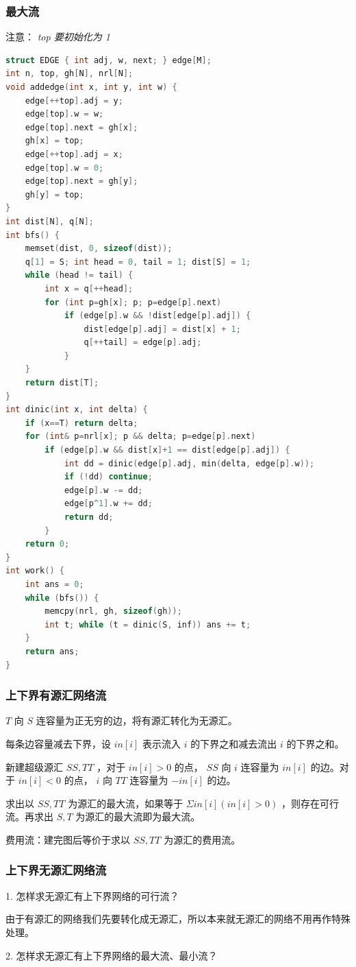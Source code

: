 \documentclass{article}
\begin{document}
\subsubsection{最大流}
注意： \emph{top 要初始化为 1}
\begin{lstlisting}[language=C++]
struct EDGE { int adj, w, next; } edge[M];
int n, top, gh[N], nrl[N];
void addedge(int x, int y, int w) {
	edge[++top].adj = y;
	edge[top].w = w;
	edge[top].next = gh[x];
	gh[x] = top;
	edge[++top].adj = x;
	edge[top].w = 0;
	edge[top].next = gh[y];
	gh[y] = top;
}
int dist[N], q[N];
int bfs() {
	memset(dist, 0, sizeof(dist));
	q[1] = S; int head = 0, tail = 1; dist[S] = 1;
	while (head != tail) {
		int x = q[++head];
		for (int p=gh[x]; p; p=edge[p].next)
			if (edge[p].w && !dist[edge[p].adj]) {
				dist[edge[p].adj] = dist[x] + 1;
				q[++tail] = edge[p].adj;
			}
	}
	return dist[T];
}
int dinic(int x, int delta) {
	if (x==T) return delta;
	for (int& p=nrl[x]; p && delta; p=edge[p].next)
		if (edge[p].w && dist[x]+1 == dist[edge[p].adj]) {
			int dd = dinic(edge[p].adj, min(delta, edge[p].w));
			if (!dd) continue;
			edge[p].w -= dd;
			edge[p^1].w += dd;
			return dd;
		}
	return 0;
}
int work() {
	int ans = 0;
	while (bfs()) {
		memcpy(nrl, gh, sizeof(gh));
		int t; while (t = dinic(S, inf)) ans += t;
	}
	return ans;
}
\end{lstlisting}
\subsubsection{上下界有源汇网络流}
$T$ 向 $S$ 连容量为正无穷的边，将有源汇转化为无源汇。 

每条边容量减去下界，设 $in[i]$ 表示流入 $i$ 的下界之和减去流出 $i$ 的下界之和。  

新建超级源汇 $SS, TT$ ，对于 $in[i] > 0$ 的点， $SS$ 向 $i$ 连容量为 $in[i]$ 的边。对于 $in[i] < 0$ 的点， $i$ 向 $TT$ 连容量为 $-in[i]$ 的边。 

求出以 $SS, TT$ 为源汇的最大流，如果等于 $\Sigma in[i] (in[i]>0)$ ，则存在可行流。再求出 $S, T$ 为源汇的最大流即为最大流。 

费用流：建完图后等价于求以 $SS, TT$ 为源汇的费用流。
\subsubsection{上下界无源汇网络流}
1. 怎样求无源汇有上下界网络的可行流？ 

由于有源汇的网络我们先要转化成无源汇，所以本来就无源汇的网络不用再作特殊处理。 

2. 怎样求无源汇有上下界网络的最大流、最小流？ 
\end{document}
